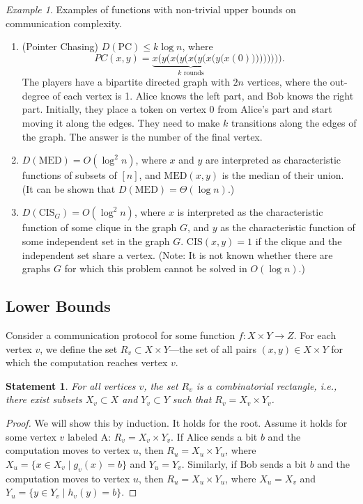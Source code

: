 \documentclass[12pt,sans]{article}
\theoremstyle{definition}
\theoremstyle{plain}
\newtheorem{statement}{Statement}[section]
\theoremstyle{remark}
\newtheorem{example}{Example}[section]
\begin{document}
\begin{example} Examples of functions with non-trivial upper bounds on communication complexity.
    \begin{enumerate}
        \item (Pointer Chasing) $D(\mathrm{PC}) \le k \log n$,
        where \[PC(x,y) = \underbrace{x(y(x(y(x(y(x(y(x}_{\text{$k$ rounds}}(0))))))))).\]
        The players have a bipartite directed graph with $2n$ vertices, where the out-degree of each vertex is 1. Alice knows the left part, and Bob knows the right part. Initially, they place a token on vertex 0 from Alice's part and start moving it along the edges. They need to make $k$ transitions along the edges of the graph. The answer is the number of the final vertex.

        \item $D(\mathrm{MED}) = O(\log^2 n)$, where $x$ and $y$ are interpreted as characteristic functions of subsets of $[n]$, and $\mathrm{MED}(x,y)$ is the median of their union. (It can be shown that $D(\mathrm{MED}) = \Theta(\log n)$.)

        \item $D(\mathrm{CIS}_G) = O(\log^2 n)$, where $x$ is interpreted as the characteristic function of some clique in the graph $G$, and $y$ as the characteristic function of some independent set in the graph $G$. $\mathrm{CIS}(x,y) = 1$ if the clique and the independent set share a vertex. (Note: It is not known whether there are graphs $G$ for which this problem cannot be solved in $O(\log n)$.)
    \end{enumerate}
\end{example}

\subsection{Lower Bounds}
Consider a communication protocol for some function $f: X \times Y \to Z$. For each vertex $v$, we define the set $R_v \subset X \times Y$—the set of all pairs $(x,y) \in X \times Y$ for which the computation reaches vertex $v$.

\begin{statement}
    For all vertices $v$, the set $R_v$ is a combinatorial rectangle, i.e., there exist subsets $X_v \subset X$ and $Y_v \subset Y$ such that $R_v = X_v \times Y_v$.
\end{statement}

\begin{proof}
    We will show this by induction. It holds for the root. Assume it holds for some vertex $v$ labeled A: $R_v = X_v \times Y_v$. If Alice sends a bit $b$ and the computation moves to vertex $u$, then $R_u = X_u \times Y_u$, where $X_u = \{x \in X_v \mid g_v(x) = b\}$ and $Y_u = Y_v$. Similarly, if Bob sends a bit $b$ and the computation moves to vertex $u$, then $R_u = X_u \times Y_u$, where $X_u = X_v$ and $Y_u = \{y \in Y_v \mid h_v(y) = b\}$.
\end{proof}
\end{document}

